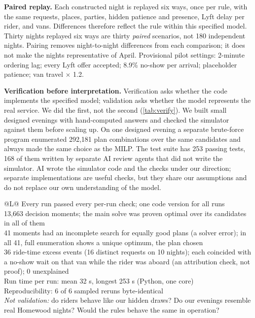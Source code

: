 \documentclass{article}
\begin{document}
\textbf{Paired replay.} Each constructed night is replayed six ways, once per rule, with the same requests, places, parties, hidden patience and presence, Lyft delay per rider, and vans. Differences therefore reflect the rule within this specified model. Thirty nights replayed six ways are thirty \emph{paired} scenarios, not 180 independent nights. Pairing removes night-to-night differences from each comparison; it does not make the nights representative of April. Provisional pilot settings: 2-minute ordering lag; every Lyft offer accepted; 8.9\% no-show per arrival; placeholder patience; van travel $\times$ 1.2.

\textbf{Verification before interpretation.} Verification asks whether the code implements the specified model; validation asks whether the model represents the real service. We did the first, not the second (\cref{tab:verify}). We built small designed evenings with hand-computed answers and checked the simulator against them before scaling up. On one designed evening a separate brute-force program enumerated 292,181 plan combinations over the same candidates and always made the same choice as the MILP. The test suite has 253 passing tests, 168 of them written by separate AI review agents that did not write the simulator. AI wrote the simulator code and the checks under our direction; separate implementations are useful checks, but they share our assumptions and do not replace our own understanding of the model.

\begin{table}[t]
\centering\small
\caption{Verification evidence and numerical diagnostics for the pilot batch (180 runs).}\label{tab:verify}
\begin{tabularx}{\columnwidth}{@{}L@{}}
\toprule
Every run passed every per-run check; one code version for all runs\\
13,663 decision moments; the main solve was proven optimal over its candidates in all of them\\
41 moments had an incomplete search for equally good plans (a solver error); in all 41, full enumeration shows a unique optimum, the plan chosen\\
36 ride-time excess events (16 distinct requests on 10 nights); each coincided with a no-show wait on that van while the rider was aboard (an attribution check, not proof); 0 unexplained\\
Run time per run: mean 32 s, longest 253 s (Python, one core)\\
Reproducibility: 6 of 6 sampled reruns byte-identical\\
\midrule
\emph{Not validation:} do riders behave like our hidden draws? Do our evenings resemble real Homewood nights? Would the rules behave the same in operation?\\
\bottomrule
\end{tabularx}
\end{table}
\end{document}
